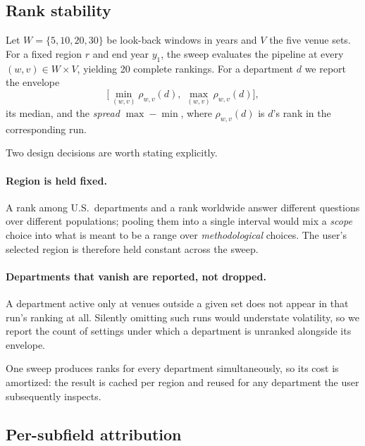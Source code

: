 \documentclass[11pt]{article}
\begin{document}
\subsection{Rank stability}
\label{sec:stability}

Let $W = \{5, 10, 20, 30\}$ be look-back windows in years and $V$ the five
venue sets. For a fixed region $r$ and end year $y_1$, the sweep evaluates the
pipeline at every $(w, v) \in W \times V$, yielding 20 complete rankings. For a
department $d$ we report the envelope
\begin{equation}
  \big[\min_{(w,v)} \rho_{w,v}(d),\ \max_{(w,v)} \rho_{w,v}(d)\big],
\end{equation}
its median, and the \emph{spread} $\max - \min$, where $\rho_{w,v}(d)$ is $d$'s
rank in the corresponding run.

Two design decisions are worth stating explicitly.

\paragraph{Region is held fixed.} A rank among U.S.\ departments and a rank
worldwide answer different questions over different populations; pooling them
into a single interval would mix a \emph{scope} choice into what is meant to be
a range over \emph{methodological} choices. The user's selected region is
therefore held constant across the sweep.

\paragraph{Departments that vanish are reported, not dropped.} A department
active only at venues outside a given set does not appear in that run's ranking
at all. Silently omitting such runs would understate volatility, so we report
the count of settings under which a department is unranked alongside its
envelope.

One sweep produces ranks for every department simultaneously, so its cost is
amortized: the result is cached per region and reused for any department the
user subsequently inspects.

\subsection{Per-subfield attribution}
\label{sec:attribution}
\end{document}
